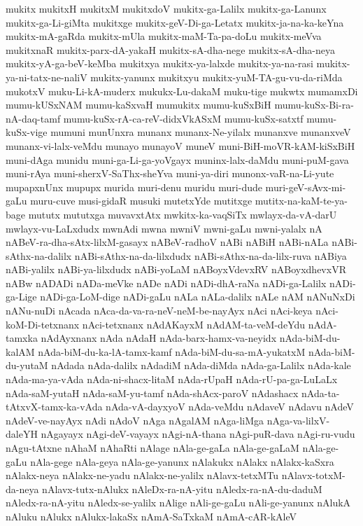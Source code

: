 {mukitx
mukitxH
mukitxM
mukitxdoV
mukitx-ga-Lalilx
mukitx-ga-Lanunx
mukitx-ga-Li-giMta
mukitxge
mukitx-geV-Di-ga-Letatx
mukitx-ja-na-ka-keYna
mukitx-mA-gaRda
mukitx-mUla
mukitx-maM-Ta-pa-doLu
mukitx-meVva
mukitxnaR
mukitx-parx-dA-yakaH
mukitx-sA-dha-nege
mukitx-sA-dha-neya
mukitx-yA-ga-beV-keMba
mukitxya
mukitx-ya-lalxde
mukitx-ya-na-rasi
mukitx-ya-ni-tatx-ne-naliV
mukitx-yanunx
mukitxyu
mukitx-yuM-TA-gu-vu-da-riMda
mukotxV
muku-Li-kA-muderx
mukukx-Lu-dakaM
muku-tige
mukwtx
mumamxDi
mumu-kUSxNAM
mumu-kaSxvaH
mumukitx
mumu-kuSxBiH
mumu-kuSx-Bi-ra-nA-daq-tamf
mumu-kuSx-rA-ca-reV-didxVkASxM
mumu-kuSx-satxtf
mumu-kuSx-vige
mumuni
munUnxra
munanx
munanx-Ne-yilalx
munanxve
munanxveV
munanx-vi-lalx-veMdu
munayo
munayoV
muneV
muni-BiH-moVR-kAM-kiSxBiH
muni-dAga
munidu
muni-ga-Li-ga-yoVgayx
muninx-lalx-daMdu
muni-puM-gava
muni-rAya
muni-sherxV-SaThx-sheYva
muni-ya-diri
munonx-vaR-na-Li-yute
mupapxnUnx
mupupx
murida
muri-denu
muridu
muri-dude
muri-geV-sAvx-mi-gaLu
muru-cuve
musi-gidaR
musuki
mutetxYde
mutitxge
mutitx-na-kaM-te-ya-bage
mututx
mututxga
muvavxtAtx
mwkitx-ka-vaqSiTx
mwlayx-da-vA-darU
mwlayx-vu-LaLxdudx
mwnAdi
mwna
mwniV
mwni-gaLu
mwni-yalalx
nA
nABeV-ra-dha-sAtx-lilxM-gasayx
nABeV-radhoV
nABi
nABiH
nABi-nALa
nABi-sAthx-na-dalilx
nABi-sAthx-na-da-lilxdudx
nABi-sAthx-na-da-lilx-ruva
nABiya
nABi-yalilx
nABi-ya-lilxdudx
nABi-yoLaM
nABoyxVdevxRV
nABoyxdhevxVR
nABw
nADADi
nADa-meVke
nADe
nADi
nADi-dhA-raNa
nADi-ga-Lalilx
nADi-ga-Lige
nADi-ga-LoM-dige
nADi-gaLu
nALa
nALa-dalilx
nALe
nAM
nANuNxDi
nANu-nuDi
nAcada
nAca-da-va-ra-neV-neM-be-nayAyx
nAci
nAci-keya
nAci-koM-Di-tetxnanx
nAci-tetxnanx
nAdAKayxM
nAdAM-ta-veM-deYdu
nAdA-tamxka
nAdAyxnanx
nAda
nAdaH
nAda-barx-hamx-va-neyidx
nAda-biM-du-kalAM
nAda-biM-du-ka-lA-tamx-kamf
nAda-biM-du-sa-mA-yukatxM
nAda-biM-du-yutaM
nAdada
nAda-dalilx
nAdadiM
nAda-diMda
nAda-ga-Lalilx
nAda-kale
nAda-ma-ya-vAda
nAda-ni-shacx-litaM
nAda-rUpaH
nAda-rU-pa-ga-LuLaLx
nAda-saM-yutaH
nAda-saM-yu-tamf
nAda-shAcx-paroV
nAdashacx
nAda-ta-tAtxvX-tamx-ka-vAda
nAda-vA-dayxyoV
nAda-veMdu
nAdaveV
nAdavu
nAdeV
nAdeV-ve-nayAyx
nAdi
nAdoV
nAga
nAgalAM
nAga-liMga
nAga-va-lilxV-daleYH
nAgayayx
nAgi-deV-vayayx
nAgi-nA-thana
nAgi-puR-dava
nAgi-ru-vudu
nAgu-tAtxne
nAhaM
nAhaRti
nAlage
nAla-ge-gaLa
nAla-ge-gaLaM
nAla-ge-gaLu
nAla-gege
nAla-geya
nAla-ge-yanunx
nAlakukx
nAlakx
nAlakx-kaSxra
nAlakx-neya
nAlakx-ne-yadu
nAlakx-ne-yalilx
nAlavx-tetxMTu
nAlavx-totxM-da-neya
nAlavx-tutx-nAlukx
nAleDx-ra-nA-yitu
nAledx-ra-nA-du-daduM
nAledx-ra-nA-yitu
nAledx-se-yalilx
nAlige
nAli-ge-gaLu
nAli-ge-yanunx
nAlukA
nAluku
nAlukx
nAlukx-lakaSx
nAmA-SaTxkaM
nAmA-cAR-kAleV
}
